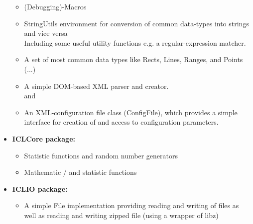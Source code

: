 \begin{itemize}
\begin{itemize}
        \item (Debugging)-Macros \\

        \item StringUtils environment for conversion of common data-types into strings and vice versa \\
        Including some useful utility functions e.g. a regular-expression matcher.

        \item A set of most common data types like Rects, Lines, Ranges, and Points \\
            
            (...)

          \item A simple DOM-based XML parser and creator.\\
           and 

        \item An XML-configuration file class (ConfigFile), which provides a simple interface for creation of and access to configuration parameters.\\

\end{itemize}

\item \textbf{ICLCore package:} \\
\begin{itemize}

        \item Statistic functions and random number generators\\

        \item Mathematic / and statistic functions\\

\end{itemize}

\item \textbf{ICLIO package:} \\
\begin{itemize}
        \item A simple File implementation providing reading and writing of files as well as reading and writing zipped file (using a wrapper of libz)\\
        

\end{itemize}
\end{itemize}
